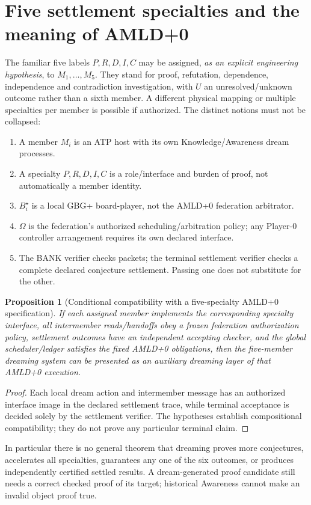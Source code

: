 \documentclass[11pt]{article}
\newtheorem{proposition}[theorem]{Proposition}
\begin{document}
\section{Five settlement specialties and the meaning of AMLD+0}
The familiar five labels $P,R,D,I,C$ may be assigned, \emph{as an explicit engineering hypothesis}, to $M_1,\ldots,M_5$. They stand for proof, refutation, dependence, independence and contradiction investigation, with $U$ an unresolved/unknown outcome rather than a sixth member. A different physical mapping or multiple specialties per member is possible if authorized. The distinct notions must not be collapsed:
\begin{enumerate}[nosep]
\item A member $M_i$ is an ATP host with its own Knowledge/Awareness dream processes.
\item A specialty $P,R,D,I,C$ is a role/interface and burden of proof, not automatically a member identity.
\item $B_i^\star$ is a local GBG+ board-player, not the AMLD+0 federation arbitrator.
\item $\Omega$ is the federation's authorized scheduling/arbitration policy; any Player-0 controller arrangement requires its own declared interface.
\item The BANK verifier checks packets; the terminal settlement verifier checks a complete declared conjecture settlement. Passing one does not substitute for the other.
\end{enumerate}
\begin{proposition}[Conditional compatibility with a five-specialty AMLD+0 specification]
If each assigned member implements the corresponding specialty interface, all intermember reads/handoffs obey a frozen federation authorization policy, settlement outcomes have an independent accepting checker, and the global scheduler/ledger satisfies the fixed AMLD+0 obligations, then the five-member dreaming system can be presented as an \emph{auxiliary dreaming layer} of that AMLD+0 execution.
\end{proposition}
\begin{proof}Each local dream action and intermember message has an authorized interface image in the declared settlement trace, while terminal acceptance is decided solely by the settlement verifier. The hypotheses establish compositional compatibility; they do not prove any particular terminal claim.\end{proof}
In particular there is no general theorem that dreaming proves more conjectures, accelerates all specialties, guarantees any one of the six outcomes, or produces independently certified settled results. A dream-generated proof candidate still needs a correct checked proof of its target; historical Awareness cannot make an invalid object proof true.
\end{document}
